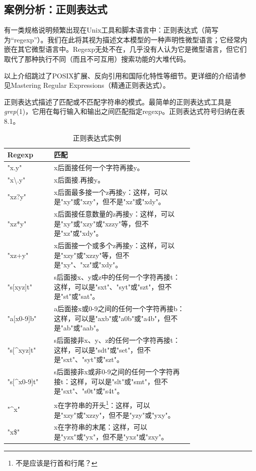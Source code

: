\documentclass[12pt,oneside]{book}
\begin{document}
\subsection{案例分析：正则表达式}
有一类规格说明频繁出现在Unix工具和脚本语言中：正则表达式（简写为“regexp”）。我们在此将其视为描述文本模型的一种声明性微型语言；它经常内嵌在其它微型语言中。Regexp无处不在，几乎没有人认为它是微型语言，但它们取代了那种执行不同（而且不可互用）搜索功能的大堆代码。

以上介绍跳过了POSIX扩展、反向引用和国际化特性等细节。更详细的介绍请参见Mastering  Regular Expressions（精通正则表达式）\cite{Friedl}。

正则表达式描述了匹配或不匹配字符串的模式。最简单的正则表达式工具是\textit{grep}(1)，它用在每行输入和输出之间匹配指定regexp。正则表达式符号归纳在表8.1。

\noindent
\begin{minipage}{\linewidth}
\begin{table}[H]
\centering
\caption{正则表达式实例}
\medskip 
\begin{tabular}{@{}lp{0.75\linewidth}@{}}
\toprule
Regexp & 匹配  \\ \midrule
"x.y" & x后面接任何一个字符再接y。 \\
"x\textbackslash{}.y" &	x后面接.再接y。 \\
"xz?y" & x后面最多接一个z再接y：这样，可以是"xy"或"xzy"，但不是"xz"或"xdy"。 \\
"xz*y" & x后面接任意数量的z再接y：这样，可以是"xy"或"xzy"或"xzzy"等，但不是"xz"或"xdy"。 \\
"xz+y" & x后面接一个或多个z再接y：这样，可以是"xzy"或"xzzy"等，但不是"xy"、"xz"或"xdy"。 \\
"s[xyz]t" &  s后面接x、y或z中的任何一个字符再接t：这样，可以是"sxt"、"syt"或"szt"，但不是"st"或"sat"。 \\
"a[x0-9]b" & 	a后面接x或0-9之间的任何一个字符再接b：这样，可以是"axb"或"a0b"或"a4b"，但不是"ab"或"aab"。 \\
"s[\^{}xyz]t" & s后面接非x、y、z的任何一个字符再接t：这样，可以是"sdt"或"set"，但不是"sxt"、"syt"或"szt"。\\
"s[\^{}x0-9]t" & s后面接非x或非0-9之间的任何一个字符再接t：这样，可以是"slt"或"smt"，但不是"sxt"、"s0t"或"s4t"。\\
"\^{}x"	& x在字符串的开头\footnote{不是应该是行首和行尾？}：这样，可以是"xzy"或"xzzy"，但不是"yzy"或"yxy"。\\
"x\${}" & x在字符串的末尾：这样，可以是"yzx"或"yx"，但不是"yxz"或"zxy"。  
\\ \bottomrule
\end{tabular}
\end{table}
\end{minipage}
\end{document}
